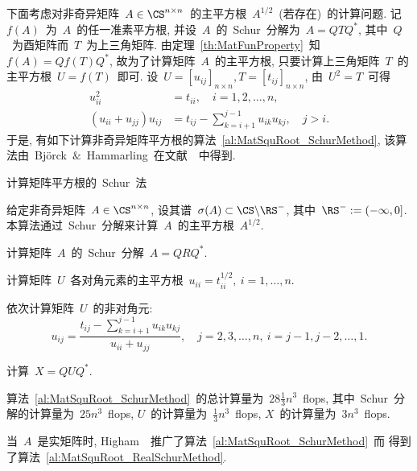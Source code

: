 下面考虑对非奇异矩阵~$A\in\CS^{n\times
n}$~的主平方根~$A^{1/2}$~(若存在)~的计算问题.
记~$f(A)$~为~$A$~的任一准素平方根,
并设~$A$~的~Schur~分解为~$A=QTQ^*$,
其中~$Q$~为酉矩阵而~$T$~为上三角矩阵.
由定理~\ref{th:MatFunProperty}~知~$f(A)=Qf(T)Q^*$,
故为了计算矩阵~$A$~的主平方根,  只要计算上三角矩阵~$T$~的主平方根~$U
= f(T)$~即可. 设~$U=[u_{ij}]_{n\times n}, T=[t_{ij}]_{n\times n}$,
由~$U^2 = T$~可得
\begin{align*}
u_{ii}^2 & = t_{ii},\quad i = 1,2,\ldots,n,\\
(u_{ii}+u_{jj})u_{ij} & = t_{ij} - \sum_{k=i+1}^{j-1}u_{ik}u_{kj},
\quad j > i.
\end{align*}
于是,
有如下计算非奇异矩阵平方根的算法~\ref{al:MatSquRoot_SchurMethod},
该算法由~Bj\"{o}rck~$\&$~Hammarling~在文献~\cite{Bjorck1983}~中得到.

\begin{algorithm}[h!]
\caption{计算矩阵平方根的~Schur~法~\cite{Bjorck1983}}
\label{al:MatSquRoot_SchurMethod} 给定非奇异矩阵~$A\in\CS^{n\times
n}$, 设其谱~$\sigma(A) \subset \CS\backslash\RS^-$, 其中~$\RS^- :=
(-\infty,0]$. 本算法通过~Schur~分解来计算~$A$~的主平方根~$A^{1/2}$.
\begin{list}{.}{
\setlength{\rightmargin}{0em}\setlength{\leftmargin}{1.2em}}
\item
计算矩阵~$A$~的~Schur~分解~$A = QRQ^*$.
\item
计算矩阵~$U$~各对角元素的主平方根~$u_{ii} = t_{ii}^{1/2},\ i = 1,
\ldots, n$.
\item
依次计算矩阵~$U$~的非对角元:
$$
u_{ij} = \displaystyle
\frac{t_{ij}-\displaystyle\sum_{k=i+1}^{j-1}u_{ik}u_{kj}}{u_{ii}+u_{jj}},
\quad j = 2,3,\ldots,n,\ i = j-1,j-2,\ldots,1.
$$
\item
计算~$X = QUQ^*$.
\end{list}
\end{algorithm}

算法~\ref{al:MatSquRoot_SchurMethod}~的总计算量为~$28\frac{1}{3}n^3$~flops,
其中~Schur~分解的计算量为~$25n^3$~flops,
$U$~的计算量为~$\frac{1}{3}n^3$~flops,  $X$~的计算量为~$3n^3$~flops.

当~$A$~是实矩阵时,
Higham~\cite{Higham1987}~推广了算法~\ref{al:MatSquRoot_SchurMethod}~而
得到了算法~\ref{al:MatSquRoot_RealSchurMethod}.

